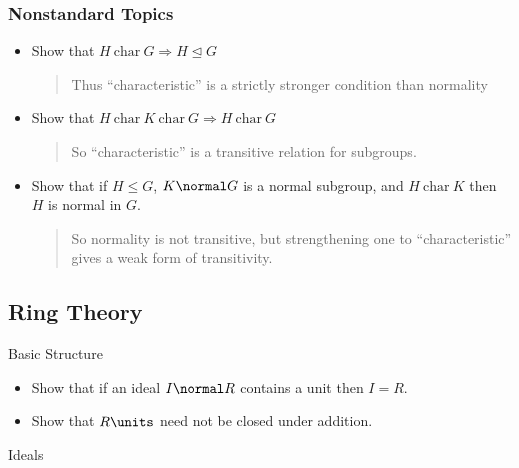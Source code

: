 \hypertarget{nonstandard-topics}{%
\subsubsection{Nonstandard Topics}\label{nonstandard-topics}}

\begin{itemize}
\item
  Show that \(H~\text{char}~G \Rightarrow H \unlhd G\)

  \begin{quote}
  Thus ``characteristic'' is a strictly stronger condition than
  normality
  \end{quote}
\item
  Show that
  \(H ~\text{char}~ K ~\text{char}~G \Rightarrow H ~\text{char}~ G\)

  \begin{quote}
  So ``characteristic'' is a transitive relation for subgroups.
  \end{quote}
\item
  Show that if \(H \leq G\), \(K\normal G\) is a normal subgroup, and
  \(H~\text{char}~K\) then \(H\) is normal in \(G\).

  \begin{quote}
  So normality is not transitive, but strengthening one to
  ``characteristic'' gives a weak form of transitivity.
  \end{quote}
\end{itemize}

\hypertarget{ring-theory}{%
\subsection{Ring Theory}\label{ring-theory}}

Basic Structure

\begin{itemize}
\tightlist
\item
  Show that if an ideal \(I\normal R\) contains a unit then \(I = R\).
\item
  Show that \(R\units\) need not be closed under addition.
\end{itemize}

Ideals

